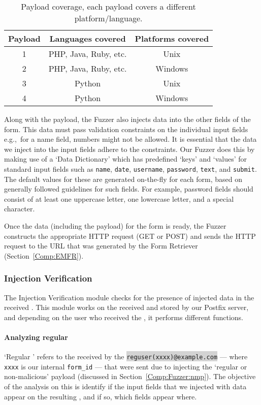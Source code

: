 \begin{table}[!htbp]
	\centering
	\begin{tabular}{|c|c|c|}
		\hline
		\multicolumn{1}{|c|}{\textbf{Payload}} & \multicolumn{1}{c}{\textbf{Languages covered}} & \multicolumn{1}{|c|}{\textbf{Platforms covered}}\\
		\hline
		1 & PHP, Java, Ruby, etc. & Unix\\
		\hline
		2 & PHP, Java, Ruby, etc. & Windows\\
		\hline
		3 & Python & Unix\\
		\hline
		4 & Python & Windows\\
		\hline
	\end{tabular}
	\caption[]{Payload coverage, each payload covers a different platform/language.}
	\label{tab:payloadcov}
\end{table}
Along with the payload, the Fuzzer also injects data into the other fields of the form. This data must pass validation constraints on the individual input fields e.g.,\ for a name field, numbers might not be allowed. It is essential that the data we inject into the input fields adhere to the constraints. Our Fuzzer does this by making use of a `Data Dictionary' which has predefined `keys' and `values' for standard input fields such as \texttt{name}, \texttt{date}, \texttt{username}, \texttt{password}, \texttt{text}, and \texttt{submit}. The default values for these are generated on-the-fly for each form, based on generally followed guidelines for such fields. For example, password fields should consist of at least one uppercase letter, one lowercase letter, and a special character.

Once the data (including the payload) for the form is ready, the Fuzzer constructs the appropriate HTTP request (GET or POST) and sends the HTTP request to the URL that was generated by the \Email Form Retriever (Section~\ref{Comp:EMFR}). 


\subsubsection{Injection Verification}
\label{Comp:EMA}
The Injection Verification module checks for the presence of injected data in the received \emails. This module works on the \emails received and stored by our Postfix server, and depending on the user who received the \email, it performs different functions.
\paragraph{Analyzing regular \email}
\sloppy
`Regular \email' refers to the \emails received by the \colorbox{lightgray}{\lstinline{reguser(xxxx)@example.com}} --- where \texttt{xxxx} is our internal \texttt{form\_id} --- that were sent due to injecting the `regular or non-malicious' payload (discussed in Section~\ref{Comp:Fuzzer:nmp}). The objective of the analysis on this \email is identify if the input fields that we injected with data appear on the resulting \email, and if so, which fields appear where.

